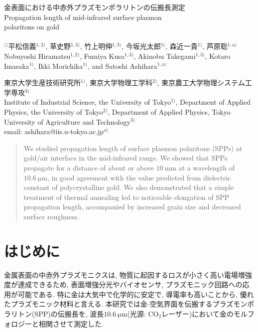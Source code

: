 \documentclass[a4,10truept]{jsarticle}
\begin{document}
\hspace{35truemm} \begin{minipage}{127truemm}
{\fontsize{14truept}{0truept} \selectfont \gt 金表面における中赤外プラズモンポラリトンの伝搬長測定\\ \rm Propagation length of mid-infrared surface plasmon\\ polaritons on gold\\ }\vspace{-0.8em}
{\fontsize{10truept}{0truept} \selectfont \mc \\ $^\bigcirc$平松信義$\!^{1,2)}$, 草史野$\!^{1,3)}$, 竹上明伸$\!^{1,3)}$, 今坂光太郎$\!^{1)}$, 森近一貴$\!^{1)}$, 芦原聡$\!^{1,\mathrm{a})}$\\ \rm Nobuyoshi Hiramatsu$^{1,2)}$, Fumiya Kusa$^{1,3)}$, Akinobu Takegami$^{1,3)}$, Kotaro Imasaka$^{1)}$, Ikki Morichika$^{1)}$, and Satoshi Ashihara$^{1,\mathrm{a})}$\\}
\end{minipage}\vspace{-0.5em}
{\mc \fontsize{10pt}{0pt} \selectfont \mc
東京大学生産技術研究所$\!^{1)}$, 東京大学物理工学科$\!^{2)}$, 東京農工大学物理システム工学専攻$\!^{3)}$\\ \rm
Institute of Industrial Science, the University of Tokyo$^{1)}$, Department of Applied Physics, the University of Tokyo$^{2)}$, Department of Applied Physics, Tokyo University of Agriculture and Technology$^{3)}$\\
email: ashihara@iis.u-tokyo.ac.jp$^{\mathrm{a})}$\\
}

\vspace{-0.9em}
\begin{abstract}
{\fontsize{10pt}{0pt} \rm We studied propagation length of surface plasmon polaritons (SPPs) at gold/air interface in the mid-infrared range. We showed that SPPs propagate for a distance of about or above $10\:\mathrm{mm}$ at a wavelength of $10.6\:\mathrm{\mu m}$, in good agreement with the value predicted from dielectric constant of polycrystalline gold. We also demonstrated that a simple treatment of thermal annealing led to noticeable elongation of SPP propagation length, accompanied by increased grain size and decreased surface roughness.}
\end{abstract}

\vspace{-1.4em}
\section{はじめに}
\vspace{-0.7em}
\mc 金属表面の中赤外プラズモニクスは, 物質に起因するロスが小さく高い電場増強度が達成できるため, 表面増強分光やバイオセンサ, プラズモニック回路への応用が可能である. 特に金は大気中で化学的に安定で, 導電率も高いことから, 優れたプラズモニック材料と言える. 本研究では金-空気界面を伝搬するプラズモンポラリトン(SPP)の伝搬長を, 波長$10.6\:\mathrm{\mu m}$(光源: $\mathrm{CO_2}\!$レーザー)において金のモルフォロジーと相関させて測定した. 
\end{document}
